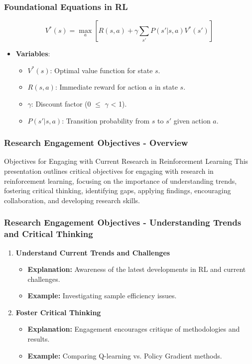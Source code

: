 \documentclass[aspectratio=169]{beamer}
\begin{document}
\begin{frame}[fragile]
    \frametitle{Foundational Equations in RL}
    \begin{equation}
        V^{*}(s) = \max_{a} \left[ R(s, a) + \gamma \sum_{s'} P(s'|s,a)V^{*}(s') \right]
    \end{equation}
    \begin{itemize}
        \item \textbf{Variables}:
        \begin{itemize}
            \item $V^{*}(s)$: Optimal value function for state $s$.
            \item $R(s, a)$: Immediate reward for action $a$ in state $s$.
            \item $\gamma$: Discount factor (0 $\leq$ $\gamma$ < 1).
            \item $P(s'|s,a)$: Transition probability from $s$ to $s'$ given action $a$.
        \end{itemize}
    \end{itemize}
\end{frame}

\begin{frame}[fragile]
    \frametitle{Research Engagement Objectives - Overview}
    \begin{block}{Objectives for Engaging with Current Research in Reinforcement Learning}
        This presentation outlines critical objectives for engaging with research in reinforcement learning, focusing on the importance of understanding trends, fostering critical thinking, identifying gaps, applying findings, encouraging collaboration, and developing research skills.
    \end{block}
\end{frame}

\begin{frame}[fragile]
    \frametitle{Research Engagement Objectives - Understanding Trends and Critical Thinking}
    \begin{enumerate}
        \item \textbf{Understand Current Trends and Challenges}
            \begin{itemize}
                \item \textbf{Explanation:} Awareness of the latest developments in RL and current challenges.
                \item \textbf{Example:} Investigating sample efficiency issues.
            \end{itemize}
        \item \textbf{Foster Critical Thinking}
            \begin{itemize}
                \item \textbf{Explanation:} Engagement encourages critique of methodologies and results.
                \item \textbf{Example:} Comparing Q-learning vs. Policy Gradient methods.
            \end{itemize}
    \end{enumerate}
\end{frame}
\end{document}
